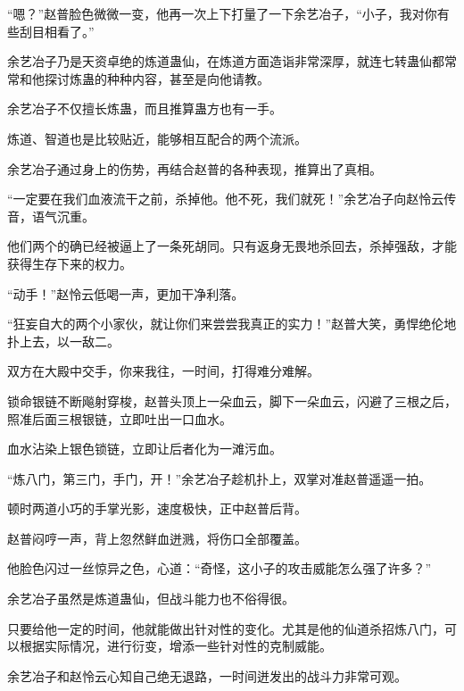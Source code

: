 \begin{this_body}
“嗯？”赵普脸色微微一变，他再一次上下打量了一下余艺冶子，“小子，我对你有些刮目相看了。”

余艺冶子乃是天资卓绝的炼道蛊仙，在炼道方面造诣非常深厚，就连七转蛊仙都常常和他探讨炼蛊的种种内容，甚至是向他请教。

余艺冶子不仅擅长炼蛊，而且推算蛊方也有一手。

炼道、智道也是比较贴近，能够相互配合的两个流派。

余艺冶子通过身上的伤势，再结合赵普的各种表现，推算出了真相。

“一定要在我们血液流干之前，杀掉他。他不死，我们就死！”余艺冶子向赵怜云传音，语气沉重。

他们两个的确已经被逼上了一条死胡同。只有返身无畏地杀回去，杀掉强敌，才能获得生存下来的权力。

“动手！”赵怜云低喝一声，更加干净利落。

“狂妄自大的两个小家伙，就让你们来尝尝我真正的实力！”赵普大笑，勇悍绝伦地扑上去，以一敌二。

双方在大殿中交手，你来我往，一时间，打得难分难解。

锁命银链不断飚射穿梭，赵普头顶上一朵血云，脚下一朵血云，闪避了三根之后，照准后面三根银链，立即吐出一口血水。

血水沾染上银色锁链，立即让后者化为一滩污血。

“炼八门，第三门，手门，开！”余艺冶子趁机扑上，双掌对准赵普遥遥一拍。

顿时两道小巧的手掌光影，速度极快，正中赵普后背。

赵普闷哼一声，背上忽然鲜血迸溅，将伤口全部覆盖。

他脸色闪过一丝惊异之色，心道：“奇怪，这小子的攻击威能怎么强了许多？”

余艺冶子虽然是炼道蛊仙，但战斗能力也不俗得很。

只要给他一定的时间，他就能做出针对性的变化。尤其是他的仙道杀招炼八门，可以根据实际情况，进行衍变，增添一些针对性的克制威能。

余艺冶子和赵怜云心知自己绝无退路，一时间迸发出的战斗力非常可观。

\end{this_body}

